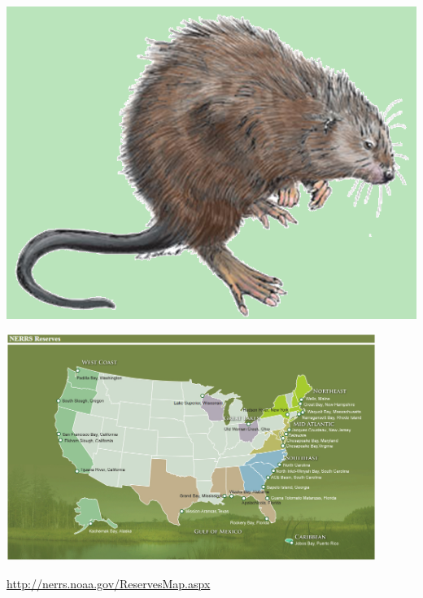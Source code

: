 \documentclass[serif]{beamer}\usepackage[]{graphicx}\usepackage[]{color}
\begin{document}
\begin{frame}{\includegraphics[width=0.05\paperwidth]{fig/muskrat.png}\hspace{0.07in}{\bf What is NERRS/SWMP?}}
\centerline{\includegraphics[width = 0.9\textwidth]{fig/NERRS_locations.png}}
\tiny
\flushright
\href{http://nerrs.noaa.gov/ReservesMap.aspx}{http://nerrs.noaa.gov/ReservesMap.aspx}
\end{frame}
\end{document}

